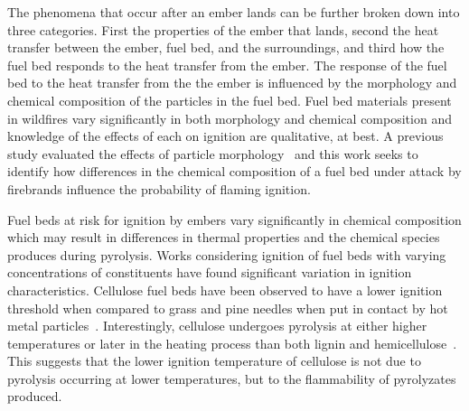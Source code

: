     The phenomena that occur after an ember lands can be further broken down into three categories. First the properties of the ember that lands, second the heat transfer between the ember, fuel bed, and the surroundings, and third how the fuel bed responds to the heat transfer from the ember. The response of the fuel bed to the heat transfer from the the ember is influenced by the morphology and chemical composition of the particles in the fuel bed. Fuel bed materials present in wildfires vary significantly in both morphology and chemical composition and knowledge of the effects of each on ignition are qualitative, at best. A previous study evaluated the effects of particle morphology~\cite{Bean2021} and this work seeks to identify how differences in the chemical composition of a fuel bed under attack by firebrands influence the probability of flaming ignition. 
    
    Fuel beds at risk for ignition by embers vary significantly in chemical composition which may result in differences in thermal properties and the chemical species produces during pyrolysis. Works considering ignition of fuel beds with varying concentrations of constituents have found significant variation in ignition characteristics. Cellulose fuel beds have been observed to have a lower ignition threshold when compared to grass and pine needles when put in contact by hot metal particles~\cite{Urban2018}. Interestingly, cellulose undergoes pyrolysis at either higher temperatures or later in the heating process than both lignin and hemicellulose~\cite{Yang2007a, Shotorban2018}. This suggests that the lower ignition temperature of cellulose is not due to pyrolysis occurring at lower temperatures, but to the flammability of pyrolyzates produced. 
    
